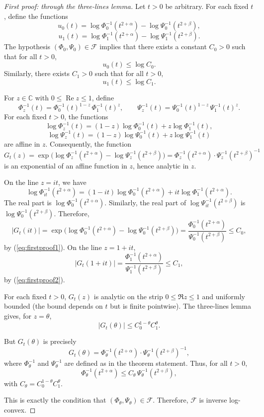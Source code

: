 \documentclass[12pt]{amsart}
\begin{document}
\begin{proof}[First proof: through the three-lines lemma]
Let $t > 0$ be arbitrary. For each fixed $t$, define the functions
\[
u_0(t) = \log \Phi_0^{-1}(t^{2+\alpha}) - \log \Psi_0^{-1}(t^{2+\beta}),
\]
\[
u_1(t) = \log \Phi_1^{-1}(t^{2+\alpha}) - \log \Psi_1^{-1}(t^{2+\beta}).
\]
The hypothesis $(\Phi_0,\Psi_0) \in \mathcal{F}$ implies that there exists a constant
$C_0 > 0$ such that for all $t > 0$,
\begin{equation}\label{eq:firstproof1}
u_0(t) \le \log C_0. 
\end{equation}
Similarly, there exists $C_1 > 0$ such that for all $t > 0$,
\begin{equation}\label{eq:firstproof2}
u_1(t) \le \log C_1. 
\end{equation}


For $z \in \mathbb{C}$ with $0 \le \operatorname{Re} z \le 1$, define
\[
\Phi_z^{-1}(t) = \Phi_0^{-1}(t)^{1-z} \, \Phi_1^{-1}(t)^{z},
\qquad
\Psi_z^{-1}(t) = \Psi_0^{-1}(t)^{1-z} \, \Psi_1^{-1}(t)^{z}.
\]
For each fixed $t > 0$, the functions
\[
\log \Phi_z^{-1}(t) = (1-z)\log \Phi_0^{-1}(t) + z \log \Phi_1^{-1}(t),
\]
\[
\log \Psi_z^{-1}(t) = (1-z)\log \Psi_0^{-1}(t) + z \log \Psi_1^{-1}(t)
\]
are affine in $z$. Consequently, the function
\[
G_t(z) = \exp\Big( \log \Phi_z^{-1}(t^{2+\alpha}) - \log \Psi_z^{-1}(t^{2+\beta}) \Big)
= \Phi_z^{-1}(t^{2+\alpha}) \cdot \Psi_z^{-1}(t^{2+\beta})^{-1}
\]
is an exponential of an affine function in $z$, hence analytic in $z$.


On the line $z = it$, we have
\[
\log \Phi_{it}^{-1}(t^{2+\alpha}) = (1-it)\log \Phi_0^{-1}(t^{2+\alpha}) + it \log \Phi_1^{-1}(t^{2+\alpha}).
\]
The real part is $\log \Phi_0^{-1}(t^{2+\alpha})$. Similarly,
the real part of $\log \Psi_{it}^{-1}(t^{2+\beta})$ is $\log \Psi_0^{-1}(t^{2+\beta})$.
Therefore,
\[
|G_t(it)| = \exp\Big( \log \Phi_0^{-1}(t^{2+\alpha}) - \log \Psi_0^{-1}(t^{2+\beta}) \Big)
= \frac{\Phi_0^{-1}(t^{2+\alpha})}{\Psi_0^{-1}(t^{2+\beta})} \le C_0,
\]
by (\ref{eq:firstproof1}). On the line $z = 1+it$,
\[
|G_t(1+it)| = \frac{\Phi_1^{-1}(t^{2+\alpha})}{\Psi_1^{-1}(t^{2+\beta})} \le C_1,
\]
by (\ref{eq:firstproof2}).

For each fixed $t > 0$, $G_t(z)$ is analytic on the strip  $0\leq \Re z\leq 1$ and uniformly bounded
(the bound depends on $t$ but is finite pointwise). The three-lines lemma gives,
for $z = \theta$,
\[
|G_t(\theta)| \le C_0^{1-\theta} C_1^{\theta}.
\]

But $G_t(\theta)$ is precisely
\[
G_t(\theta) = \Phi_\theta^{-1}(t^{2+\alpha}) \cdot \Psi_\theta^{-1}(t^{2+\beta})^{-1},
\]
where $\Phi_\theta^{-1}$ and $\Psi_\theta^{-1}$ are defined as in the theorem statement.
Thus, for all $t > 0$,
\[
\Phi_\theta^{-1}(t^{2+\alpha}) \le C_\theta \, \Psi_\theta^{-1}(t^{2+\beta}),
\]
with $C_\theta = C_0^{1-\theta} C_1^{\theta}$.

This is exactly the condition that $(\Phi_\theta,\Psi_\theta) \in \mathcal{F}$.
Therefore, $\mathcal{F}$ is inverse log-convex.
\end{proof}
\end{document}
